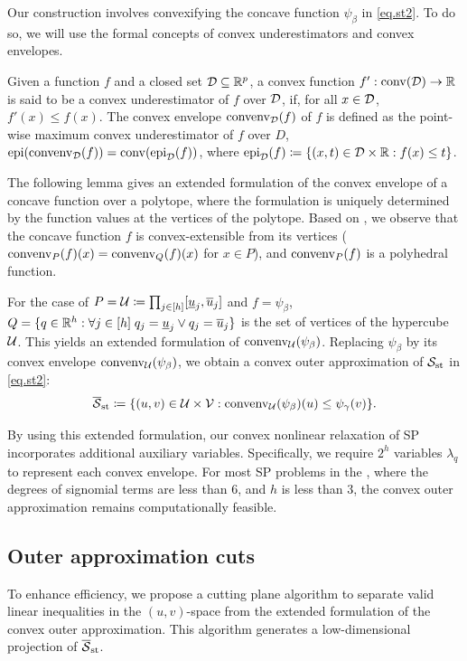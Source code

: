 Our construction involves convexifying the concave function $\psi_{\beta}$ in \eqref{eq.st2}. To do so, we will use the formal concepts of convex underestimators and convex envelopes.

Given a function  $f$ and a closed set $\mathcal D \subseteq \mathbb R^p$, a convex function $f':\operatorname{conv}(\mathcal D) \to \mathbb R$ is said to be a convex underestimator of $f$ over $\mathcal D$, if, for all $x \in \mathcal D$, $f'(x) \le f(x)$. The
 convex envelope $\operatorname{convenv}_{\mathcal D}(f)$  of $f$  is defined as the point-wise maximum convex underestimator of $f$ over $D$, \ie  $\operatorname{epi}(\operatorname{convenv}_{\mathcal D}(f)) = \operatorname{conv}(\operatorname{epi}_{\mathcal D}(f))$, where $\operatorname{epi}_{\mathcal D}(f) \coloneqq \{(x,t) \in \mathcal D \times \mathbb R: f(x) \le t\}$.


 The following lemma gives an extended formulation of the convex envelope of a concave function over a polytope, where the formulation is uniquely determined by the function values at the vertices of the polytope. Based on , we observe that the concave function $f$ is convex-extensible from its vertices (\ie $\operatorname{convenv}_{P}(f)(x) = \operatorname{convenv}_{Q}(f)(x)$ for $x \in P$), and $\operatorname{convenv}_{P}(f)$ is a polyhedral function.



For the case of $P=\mathcal U \coloneqq \prod_{j \in [h]} [\underline{u}_j, \overline{u}_j]$ and $f =\psi_{\beta}$, $Q = \{q \in \mathbb R^h: \forall j \in [h] \; q_j = \underline{u}_j \lor q_j = \overline{u}_j\}$ is the set of vertices of the hypercube $\mathcal U$.  This yields an extended formulation of $\operatorname{convenv}_{\mathcal U}(\psi_{\beta})$. Replacing $\psi_{\beta}$ by its convex envelope $\operatorname{convenv}_{\mathcal U}(\psi_{\beta})$, we obtain a convex outer approximation of $ \mathcal S_{\mathrm{st}}$ in \eqref{eq.st2}:
\begin{equation*}
\label{relcss}
  \overline{\mathcal S}_{\mathrm{st}}\coloneqq\{(u,v)\in \mathcal U \times \mathcal V: \operatorname{convenv}_{\mathcal U}(\psi_{\beta})(u) \le \psi_{\gamma}(v)\}.
\end{equation*}


By using this extended formulation, our convex nonlinear relaxation of SP incorporates additional auxiliary variables. Specifically, we require $2^h$ variables $\lambda_q$ to represent each convex envelope. For most SP problems in the \minlplib, where the degrees of signomial terms are less than 6, and $h$ is less than 3, the convex outer approximation remains computationally feasible.


\subsection{Outer approximation cuts}
To enhance efficiency, we propose a cutting plane algorithm to separate valid linear inequalities in the $(u,v)$-space from the extended formulation of the convex outer approximation. This algorithm generates a low-dimensional projection of $\overline{\mathcal S}_{\mathrm{st}}$.



